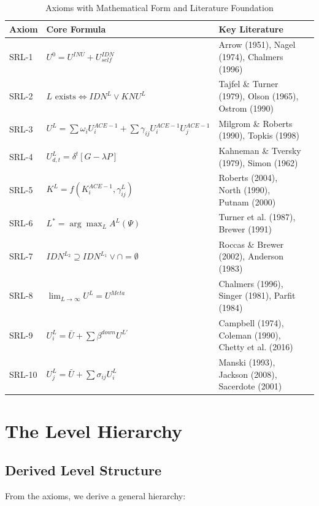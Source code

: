 \begin{table}[htbp]
\centering
\caption{Axioms with Mathematical Form and Literature Foundation}
\label{tab:aaa-axiom-summary}
\renewcommand{\arraystretch}{1.3}
\small
\begin{tabular}{@{}llll@{}}
\toprule
\textbf{Axiom} & \textbf{Core Formula} & \textbf{Key Literature} \\
\midrule
SRL-1 & $U^0 = U^{INU} + U^{IDN}_{self}$ & Arrow (1951), Nagel (1974), Chalmers (1996) \\
SRL-2 & $L \text{ exists} \iff IDN^L \lor KNU^L$ & Tajfel \& Turner (1979), Olson (1965), Ostrom (1990) \\
SRL-3 & $U^L = \sum \omega_i U^{ACE-1}_i + \sum \gamma_{ij} U^{ACE-1}_i U^{ACE-1}_j$ & Milgrom \& Roberts (1990), Topkis (1998) \\
SRL-4 & $U^L_{d,t} = \delta^t [G - \lambda P]$ & Kahneman \& Tversky (1979), Simon (1962) \\
SRL-5 & $K^L = f(K^{ACE-1}_i, \gamma^L_{ij})$ & Roberts (2004), North (1990), Putnam (2000) \\
SRL-6 & $L^* = \arg\max_L A^L(\Psi)$ & Turner et al. (1987), Brewer (1991) \\
SRL-7 & $IDN^{L_2} \supseteq IDN^{L_1} \lor \cap = \emptyset$ & Roccas \& Brewer (2002), Anderson (1983) \\
SRL-8 & $\lim_{L \to \infty} U^L = U^{Meta}$ & Chalmers (1996), Singer (1981), Parfit (1984) \\
SRL-9 & $U^L_i = \bar{U} + \sum \beta^{down} U^{L'}$ & Campbell (1974), Coleman (1990), Chetty et al. (2016) \\
SRL-10 & $U^L_j = \bar{U} + \sum \sigma_{ij} U^L_i$ & Manski (1993), Jackson (2008), Sacerdote (2001) \\
\bottomrule
\end{tabular}
\end{table}
\section{The Level Hierarchy}
\label{sec:aaa-hierarchy}

\subsection{Derived Level Structure}

From the axioms, we derive a general hierarchy:

